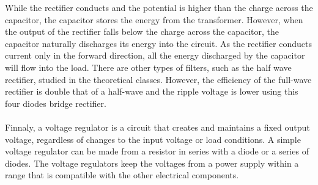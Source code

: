 While the rectifier conducts and the potential is higher than the charge across the capacitor, the capacitor stores the energy from the transformer. However,  when the output of the rectifier falls below the charge across the capacitor, the capacitor naturally discharges its energy into the circuit. As the rectifier conducts current only in the forward direction, all the energy discharged by the capacitor will flow into the load. There are other types of filters, such as the half wave rectifier, studied in the theoretical classes. However, the efficiency of the full-wave rectifier is double that of a half-wave and the ripple voltage is lower using this four diodes bridge rectifier.

\paragraph{}
Finnaly, a voltage regulator is a circuit that creates and maintains a fixed output voltage, regardless of changes to the input voltage or load conditions. A simple voltage regulator can be made from a resistor in series with a diode or a series of diodes. The voltage regulators keep the voltages from a power supply within a range that is compatible with the other electrical components.
